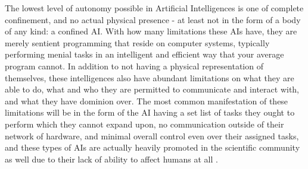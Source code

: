 The lowest level of autonomy possible in Artificial Intelligences is one of complete confinement, and no actual physical presence - at least not in the form of a body of any kind: a confined AI. With how many limitations these AIs have, they are merely sentient programming that reside on computer systems, typically performing menial tasks in an intelligent and efficient way that your average program cannot. In addition to not having a physical representation of themselves, these intelligences also have abundant limitations on what they are able to do, what and who they are permitted to communicate and interact with, and what they have dominion over. The most common manifestation of these limitations will be in the form of the AI having a set list of tasks they ought to perform which they cannot expand upon, no communication outside of their network of hardware, and minimal overall control even over their assigned tasks, and these types of AIs are actually heavily promoted in the scientific community as well due to their lack of ability to affect humans at all \cite{cecs.74:online}.